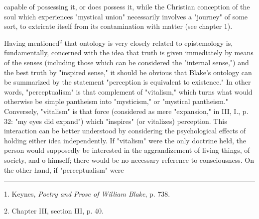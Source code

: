 capable of possessing it, or does possess it, while the 
Christian conception of the soul which experiences "mystical union" necessarily involves a "journey" of some sort, to 
extricate itself from its contamination with matter (see chapter 1).\par
\vspace*{0.5\baselineskip}
Having mentioned$^{2}$ that ontology is very closely related to epistemology is, fundamentally, concerned with the idea that
truth is given immediately by means of the senses (including those which can be considered the "internal sense,") and the best truth
by "inspired sense," it should be obvious that Blake's ontology can be summarized by the statement "perception is
equivalent to existence." In other words, "perceptualism" is that complement of "vitalism," which turns what
would otherwise be simple pantheism into "mysticism," or "mystical pantheism." Conversely, "vitalism" is that force
(considered as mere "expansion," in III, I., p. 32: "my eyes did expand") which "inspires" (or vitalizes) perception.
This interaction can be better understood by considering the psychological effects of holding either idea independently.
If "vitalism" were the only doctrine held, the person would supposedly be interested in the aggrandizement of living things, of
society, and o himself; there would be no necessary reference to consciousness. On the other hand, if "perceptualism" were\linebreak
\null\par
\vspace*{-\baselineskip}
\vspace*{\fill}
\noindent\rule{0.25\textwidth}{0.4pt}\par
1. Keynes, \textit{Poetry and Prose of William Blake}, p. 738.\par
2. Chapter III, section III, p. 40.\par

\newpage

